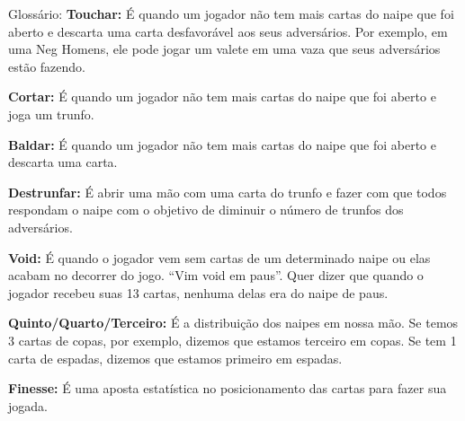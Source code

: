 \begin{subsecao}{Glossário:}
\textbf{Touchar:} É quando um jogador não tem mais cartas do naipe que foi aberto e
descarta uma carta desfavorável aos seus adversários. Por exemplo, em uma Neg
Homens, ele pode jogar um valete em uma vaza que seus adversários estão fazendo.

\textbf{Cortar:}  É quando um jogador não tem mais cartas do naipe que foi aberto e joga
um trunfo.

\textbf{Baldar:} É quando um jogador não tem mais cartas do naipe que foi aberto e
descarta uma carta.

\textbf{Destrunfar:} É abrir uma mão com uma carta do trunfo e fazer com que todos
respondam o naipe com o objetivo de diminuir o número de trunfos dos
adversários.

\textbf{Void:} É quando o jogador vem sem cartas de um determinado naipe ou elas acabam
no decorrer do jogo. “Vim void em paus”. Quer dizer que quando o jogador
recebeu suas 13 cartas, nenhuma delas era do naipe de paus.

\textbf{Quinto/Quarto/Terceiro:} É a distribuição dos naipes em nossa mão. Se temos 3
cartas de copas, por exemplo, dizemos que estamos terceiro em copas. Se tem 1
carta de espadas, dizemos que estamos primeiro em espadas.

\textbf{Finesse:} É uma aposta estatística no posicionamento das cartas para
fazer sua jogada.

\end{subsecao}
